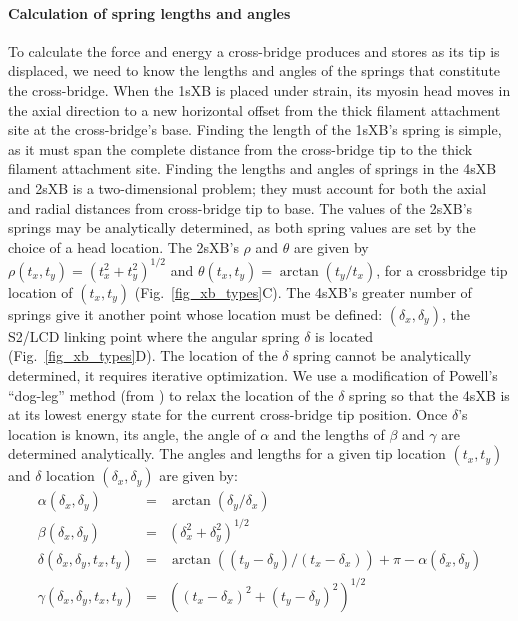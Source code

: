 \documentclass[]{article}
\begin{document}
\paragraph{Calculation of spring lengths and angles} %
To calculate the force and energy a cross-bridge produces and stores as its tip is displaced, we need to know the lengths and angles of the springs that constitute the cross-bridge. 
When the 1sXB is placed under strain, its myosin head moves in the axial direction to a new horizontal offset from the thick filament attachment site at the cross-bridge's base.
Finding the length of the 1sXB's spring is simple, as it must span the complete distance from the cross-bridge tip to the thick filament attachment site. 
Finding the lengths and angles of springs in the 4sXB and 2sXB is a two-dimensional problem; they must account for both the axial and radial distances from cross-bridge tip to base.
The values of the 2sXB's springs may be analytically determined, as both spring values are set by the choice of a head location. 
The 2sXB's  $\rho$ and $\theta$ are given by $\rho(t_x, t_y)=(t_x^2 + t_y^2)^{1/2}$ and $\theta(t_x, t_y)=\arctan(t_y/t_x)$, for a crossbridge tip location of $(t_x, t_y)$ (Fig.~\ref{fig_xb_types}C). 
The 4sXB's greater number of springs give it another point whose location must be defined: $(\delta_x, \delta_y)$, the S2/LCD linking point where the angular spring $\delta$ is located (Fig.~\ref{fig_xb_types}D). 
The location of the $\delta$ spring cannot be analytically determined, it requires iterative optimization. 
We use a modification of Powell's ``dog-leg'' method (from \citet{SciPy}) to relax the location of the $\delta$ spring so that the 4sXB is at its lowest energy state for the current cross-bridge tip position.
Once $\delta$'s location is known, its angle, the angle of $\alpha$ and the lengths of $\beta$ and $\gamma$ are determined analytically.
The angles and lengths for a given tip location $(t_x, t_y)$ and $\delta$ location $(\delta_x, \delta_y)$ are given by:
\begin{eqnarray*}
\label{4sXB_spring_values}
\alpha(\delta_x, \delta_y) &=& \arctan(\delta_y/\delta_x) \\
\beta(\delta_x, \delta_y) &=& (\delta_x^2 + \delta_y^2)^{1/2} \\
\delta(\delta_x, \delta_y, t_x, t_y) &=& \arctan((t_y-\delta_y)/(t_x-\delta_x)) + \pi - \alpha(\delta_x, \delta_y) \\
\gamma(\delta_x, \delta_y, t_x, t_y) &=& ((t_x-\delta_x)^2 + (t_y-\delta_y)^2)^{1/2} 
\end{eqnarray*}
\end{document}
